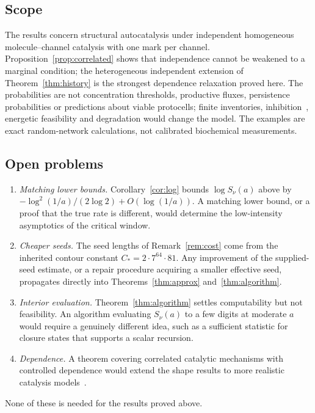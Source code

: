 \documentclass[11pt,a4paper]{article}
\theoremstyle{plain}
\theoremstyle{definition}
\theoremstyle{remark}
\begin{document}
\subsection*{Scope}
The results concern structural autocatalysis under independent homogeneous molecule--channel catalysis with one mark per channel. Proposition~\ref{prop:correlated} shows that independence cannot be weakened to a marginal condition; the heterogeneous independent extension of Theorem~\ref{thm:history} is the strongest dependence relaxation proved here. The probabilities are not concentration thresholds, productive fluxes, persistence probabilities or predictions about viable protocells; finite inventories, inhibition~\cite{hordijk2012structure}, energetic feasibility and degradation would change the model. The examples are exact random-network calculations, not calibrated biochemical measurements.

\subsection*{Open problems}
\begin{enumerate}[leftmargin=2em]
\item \emph{Matching lower bounds.} Corollary~\ref{cor:log} bounds $\log S_\nu(a)$ above by $-\log^2(1/a)/(2\log2)+O(\log(1/a))$. A matching lower bound, or a proof that the true rate is different, would determine the low-intensity asymptotics of the critical window.
\item \emph{Cheaper seeds.} The seed lengths of Remark~\ref{rem:cost} come from the inherited contour constant $C_*=2\cdot7^{64}\cdot81$. Any improvement of the supplied-seed estimate, or a repair procedure acquiring a smaller effective seed, propagates directly into Theorems~\ref{thm:approx} and~\ref{thm:algorithm}.
\item \emph{Interior evaluation.} Theorem~\ref{thm:algorithm} settles computability but not feasibility. An algorithm evaluating $S_\nu(a)$ to a few digits at moderate $a$ would require a genuinely different idea, such as a sufficient statistic for closure states that supports a scalar recursion.
\item \emph{Dependence.} A theorem covering correlated catalytic mechanisms with controlled dependence would extend the shape results to more realistic catalysis models~\cite{hordijk2016variable}.
\end{enumerate}
None of these is needed for the results proved above.
\end{document}
